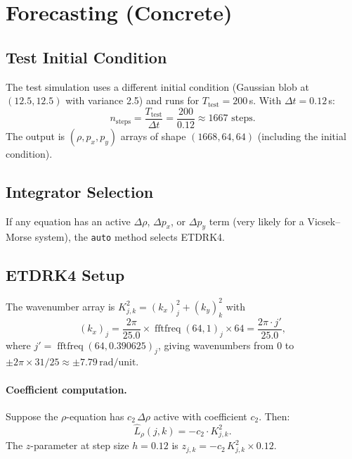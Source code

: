 \documentclass[11pt, letterpaper]{article}
\theoremstyle{definition}
\newcommand{\lap}{\Delta}
\DeclareMathOperator{\fftfreq}{fftfreq}
\begin{document}
\section{Forecasting (Concrete)}
\label{sec:concrete-forecast}

\subsection{Test Initial Condition}
The test simulation uses a different initial condition (Gaussian blob
at $(12.5, 12.5)$ with variance 2.5) and runs for
$T_{\mathrm{test}} = 200$\,s.  With $\Delta t = 0.12$\,s:
\begin{equation}
  n_{\mathrm{steps}} = \frac{T_{\mathrm{test}}}{\Delta t}
  = \frac{200}{0.12} \approx 1667 \text{ steps}.
\end{equation}
The output is $(\rho, p_x, p_y)$ arrays of shape
$(1668, 64, 64)$ (including the initial condition).

\subsection{Integrator Selection}
If any equation has an active $\lap\rho$, $\lap p_x$, or $\lap p_y$
term (very likely for a Vicsek--Morse system), the \texttt{auto}
method selects ETDRK4.

\subsection{ETDRK4 Setup}
\label{sec:concrete-etdrk4}

The wavenumber array is
$K^{2}_{j,k} = (k_x)_j^{2} + (k_y)_k^{2}$ with
\begin{equation}
  (k_x)_j = \frac{2\pi}{25.0} \times
  \fftfreq(64, 1)_j \times 64
  = \frac{2\pi \cdot j'}{25.0},
\end{equation}
where $j' = \fftfreq(64, 0.390625)_j$, giving wavenumbers from
$0$ to $\pm 2\pi \times 31/25 \approx \pm 7.79\,\text{rad/unit}$.

\paragraph{Coefficient computation.}
Suppose the $\rho$-equation has $c_2\,\lap\rho$ active with
coefficient $c_2$.  Then:
\begin{equation}
  \hat{L}_{\rho}(j,k) = -c_2 \cdot K^{2}_{j,k}.
\end{equation}
The $z$-parameter at step size $h = 0.12$ is
$z_{j,k} = -c_2 \, K^{2}_{j,k} \times 0.12$.
\end{document}
